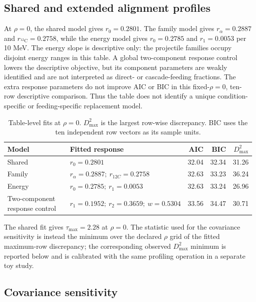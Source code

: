 \documentclass[pdflatex,iicol,sn-mathphys-num]{sn-jnl}
\begin{document}
\subsection{Shared and extended alignment profiles}

At \(\rho=0\), the shared model gives \(r_0=0.2801\). The family model gives
\(r_\alpha=0.2887\) and \(r_{^{12}\mathrm C}=0.2758\), while the energy model gives
\(r_0=0.2785\) and \(r_1=0.0053\) per 10 MeV. The energy slope is descriptive only:
the projectile families occupy disjoint energy ranges in this table. A global
two-component response control lowers the descriptive objective, but its component
parameters are weakly identified and are not interpreted as direct- or
cascade-feeding fractions. The extra response parameters do not improve AIC or BIC
in this fixed-\(\rho=0\), ten-row descriptive comparison. Thus the table does not identify a unique
condition-specific or feeding-specific replacement model.

\begin{table}[t]
\caption{Table-level fits at \(\rho=0\). \(D_{\max}^2\) is the largest row-wise discrepancy. BIC uses the ten independent row vectors as its sample units.}
\label{tab:profiles}
\small
\setlength{\tabcolsep}{2.5pt}
\begin{tabular}{@{}llrrr@{}}
\toprule
Model & Fitted response & AIC & BIC & \(D_{\max}^2\)\\
\midrule
Shared & \(r_0=0.2801\) & 32.04 & 32.34 & 31.26\\
Family & \(r_\alpha=0.2887;\ r_{12C}=0.2758\) & 32.63 & 33.23 & 36.24\\
Energy & \(r_0=0.2785;\ r_1=0.0053\) & 32.63 & 33.24 & 26.96\\
Two-component response control & \(r_1=0.1952;\ r_2=0.3659;\ w=0.5304\) & 33.56 & 34.47 & 30.71\\
\bottomrule
\end{tabular}
\end{table}

The shared fit gives \(\tau_{\max}=2.28\) at \(\rho=0\). The statistic used for the
covariance sensitivity is instead the minimum over the declared \(\rho\) grid of
the fitted maximum-row discrepancy; the corresponding observed
\(D_{\max}^2\) minimum is reported below and is calibrated with the same profiling
operation in a separate toy study.

\subsection{Covariance sensitivity}
\end{document}
